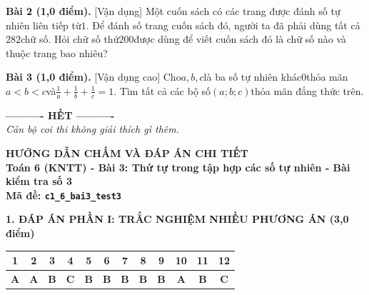 \documentclass[11pt,a4paper]{article}
\begin{document}
\noindent\textbf{Bài 2 (1,0 điểm).} [Vận dụng] Một cuốn sách có các trang được đánh số tự nhiên liên tiếp từ$1$. Để đánh số trang cuốn sách đó, người ta đã phải dùng tất cả$282$chữ số. Hỏi chữ số thứ$200$được dùng để viết cuốn sách đó là chữ số nào và thuộc trang bao nhiêu?\par\vspace{8pt}

\noindent\textbf{Bài 3 (1,0 điểm).} [Vận dụng cao] Cho$a, b, c$là ba số tự nhiên khác$0$thỏa mãn$a < b < c$và$\frac{1}{a} + \frac{1}{b} + \frac{1}{c} = 1$. Tìm tất cả các bộ số$(a; b; c)$thỏa mãn đẳng thức trên.\par\vspace{8pt}


\begin{center}
\textbf{---------- HẾT ----------}\\
\textit{\small Cán bộ coi thi không giải thích gì thêm.}
\end{center}

\newpage
\begin{center}
{\Large\bfseries HƯỚNG DẪN CHẤM VÀ ĐÁP ÁN CHI TIẾT}\\[4pt]
{\large\bfseries Toán 6 (KNTT) - Bài 3: Thứ tự trong tập hợp các số tự nhiên - Bài kiểm tra số 3}\\[2pt]
{\bfseries Mã đề: \texttt{c1\_6\_bai3\_test3}}
\end{center}

\vspace{10pt}
\noindent\textbf{\large 1. ĐÁP ÁN PHẦN I: TRẮC NGHIỆM NHIỀU PHƯƠNG ÁN (3,0 điểm)}
\vspace{4pt}
\begin{center}
\begin{tabular}{|c|c|c|c|c|c|c|c|c|c|c|c|}
\hline
\textbf{1} & \textbf{2} & \textbf{3} & \textbf{4} & \textbf{5} & \textbf{6} & \textbf{7} & \textbf{8} & \textbf{9} & \textbf{10} & \textbf{11} & \textbf{12} \\
\hline
\textbf{A} & \textbf{A} & \textbf{B} & \textbf{C} & \textbf{B} & \textbf{B} & \textbf{B} & \textbf{B} & \textbf{B} & \textbf{A} & \textbf{B} & \textbf{C} \\
\hline
\end{tabular}
\end{center}
\vspace{6pt}
\end{document}
